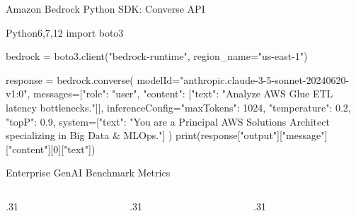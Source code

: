 \documentclass[aspectratio=169,10pt]{beamer}
\begin{document}
\begin{frame}[fragile]{Amazon Bedrock Python SDK: Converse API}
  \begin{HighlightedCodeBlock}{Python}{6,7,12}
import boto3

bedrock = boto3.client("bedrock-runtime", region_name="us-east-1")

response = bedrock.converse(
    modelId="anthropic.claude-3-5-sonnet-20240620-v1:0",
    messages=[{"role": "user", "content": [{"text": "Analyze AWS Glue ETL latency bottlenecks."}]}],
    inferenceConfig={"maxTokens": 1024, "temperature": 0.2, "topP": 0.9},
    system=[{"text": "You are a Principal AWS Solutions Architect specializing in Big Data & MLOps."}]
)
print(response["output"]["message"]["content"][0]["text"])
  \end{HighlightedCodeBlock}
\end{frame}

\begin{frame}{Enterprise GenAI Benchmark Metrics}
  \begin{columns}[T,onlytextwidth]
    \begin{column}{.31\textwidth}
    \end{column}
    \begin{column}{.31\textwidth}
    \end{column}
    \begin{column}{.31\textwidth}
    \end{column}
  \end{columns}
  \vspace{0.20cm}
\end{frame}
\end{document}
